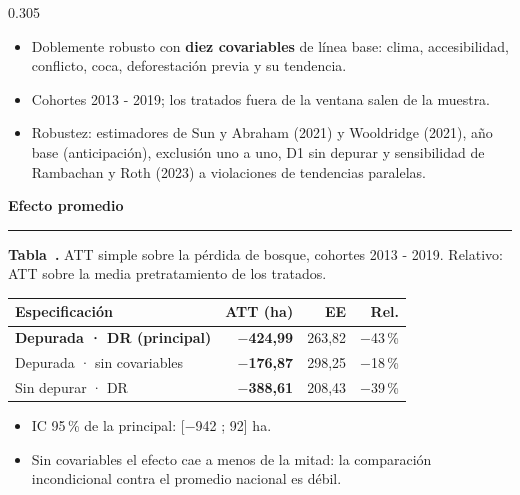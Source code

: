 \documentclass[final,t]{beamer}
\newcommand{\seccion}[2]{%
  \par\vspace{0.5\baselineskip}%
  {\color{dosel}\Large\bfseries #1\hfill{\color{tenue}\normalsize\mdseries #2}}\par
  \vspace{-0.35\baselineskip}%
  {\color{dosel}\rule{\linewidth}{2.2pt}}\par
  \vspace{0.25\baselineskip}%
}
\newcommand{\nota}[1]{{\color{tenue}\small #1\par}}
\newcounter{tabposter}
\newcommand{\tabcap}[2]{\refstepcounter{tabposter}\label{#1}%
  \nota{\textbf{Tabla~\thetabposter.} #2}}
\begin{document}
\begin{frame}[t]{}
\begin{columns}[t]
\begin{column}{0.305\paperwidth}
\begin{itemize}
  \item Doblemente robusto con \textbf{diez covariables} de línea base: clima, accesibilidad,
        conflicto, coca, deforestación previa y su tendencia.
  \item Cohortes 2013 - 2019; los tratados fuera de la ventana salen de la muestra.
  \item Robustez: estimadores de Sun y Abraham (2021) y Wooldridge (2021), año base
        (anticipación), exclusión uno a uno, D1 sin depurar y sensibilidad de Rambachan y Roth (2023) a violaciones de tendencias paralelas.
\end{itemize}

\seccion{Efecto promedio}{}
\tabcap{tab:att}{ATT simple sobre la pérdida de bosque, cohortes 2013 - 2019. Relativo: ATT sobre
la media pretratamiento de los tratados.}
\begin{center}
\begin{tabularx}{\linewidth}{Xrrr}
\toprule
\rowcolor{dosel}
\textcolor{papel}{\textbf{Especificación}} & \textcolor{papel}{\textbf{ATT (ha)}} &
\textcolor{papel}{\textbf{EE}} & \textcolor{papel}{\textbf{Rel.}}\\
\midrule
\rowcolor{orofondo}
\textbf{Depurada · DR (principal)} & \textcolor{reduccion}{\textbf{$-$424,99}} & 263,82 & $-$43\,\%\\
Depurada · sin covariables & \textcolor{reduccion}{\textbf{$-$176,87}} & 298,25 & $-$18\,\%\\
Sin depurar · DR           & \textcolor{reduccion}{\textbf{$-$388,61}} & 208,43 & $-$39\,\%\\
\bottomrule
\end{tabularx}
\end{center}
\begin{itemize}
  \item IC 95\,\% de la principal: [$-$942 ; 92] ha.
  \item[\textcolor{brasa}{\rule{0.45ex}{0.45ex}}] Sin covariables el efecto cae a menos de la mitad:
        la comparación incondicional contra el promedio nacional es débil.
\end{itemize}


\end{column}
\end{columns}
\end{frame}
\end{document}
